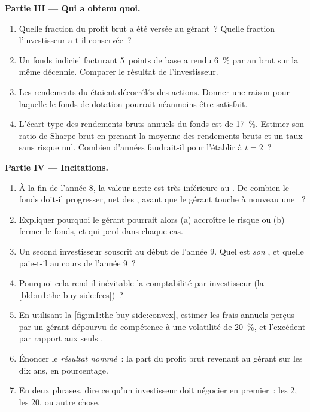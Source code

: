\begin{problem}
\medskip\noindent\textbf{Partie III --- Qui a obtenu quoi.}
\begin{enumerate}[resume]
\item Quelle fraction du profit brut a été versée au gérant~? Quelle
fraction l'investisseur a-t-il conservée~?
\item Un fonds indiciel facturant 5~points de base a rendu 6~\% par an brut sur
la même décennie. Comparer le résultat de l'investisseur.
\item Les rendements du  étaient décorrélés des actions. Donner une
raison pour laquelle le fonds de dotation pourrait néanmoins être satisfait.
\item L'écart-type des rendements bruts annuels du fonds est de 17~\%.
Estimer son ratio de Sharpe brut en prenant la moyenne des rendements bruts et un
taux sans risque nul. Combien d'années faudrait-il pour l'établir à $t = 2$~?
\end{enumerate}

\medskip\noindent\textbf{Partie IV --- Incitations.}
\begin{enumerate}[resume]
\item À la fin de l'année 8, la valeur nette est très inférieure au . De combien
le fonds doit-il progresser, net des , avant que le gérant
touche à nouveau une ~?
\item Expliquer pourquoi le gérant pourrait alors (a) accroître le risque ou (b) fermer le
fonds, et qui perd dans chaque cas.
\item Un second investisseur souscrit au début de l'année 9. Quel est
\emph{son} , et quelle  paie-t-il au cours de l'année 9~?
\item Pourquoi cela rend-il inévitable la comptabilité par investisseur
(la \cref{bld:m1:the-buy-side:fees})~?
\item En utilisant la \cref{fig:m1:the-buy-side:convex}, estimer les frais annuels perçus
par un gérant dépourvu de compétence à une volatilité de 20~\%, et l'excédent
par rapport aux seuls .
\item Énoncer le \emph{résultat nommé}~: la part du profit brut
revenant au gérant sur les dix ans, en pourcentage.
\item En deux phrases, dire ce qu'un investisseur doit négocier en premier~: les
2, les 20, ou autre chose.
\end{enumerate}
\end{problem}


